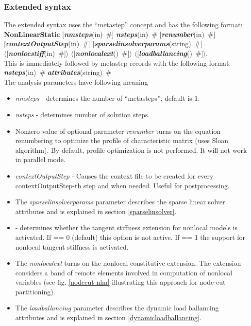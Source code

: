 \documentclass[draft]{article}
\newcommand{\param}[1]{{\em #1}}
\newcommand{\fieldVal}[2]{\mbox{({\it\bf{#1}\#)\tiny (#2)}}}
\newcommand{\keywordnotype}[1]{\mbox{{\it{\bf{#1}}}}}
\newcommand{\keyword}[2]{\mbox{{\keywordnotype{#1}\tiny (#2)}}}
\newcommand{\entKeywordInst}[1]{\mbox{{\bf{{#1}}}}}
\newcommand{\field}[2]{\mbox{\keyword{#1}{#2}~\#}}
\newcommand{\optField}[2]{\mbox{[\field{#1}{#2}]}}
\newcommand{\Pmode}[1]{{\sffamily #1}}
\newcommand{\PoptField}[2]{\mbox{$\langle$[\field{#1}{#2}]$\rangle$}}
\begin{document}
\subsubsection{Extended syntax}
The extended syntax uses the ``metastep'' concept and has the
following format:
\entKeywordInst{NonLinearStatic} \optField{nmsteps}{in} \field{nsteps}{in} \optField{renumber}{in}\\
\optField{contextOutputStep}{in}
\optField{sparselinsolverparams}{string}\\
\PoptField{nonlocstiff}{in} \PoptField{nonlocalext}{} \PoptField{loadballancing}{}.\\
This is immediately followed by metastep records with the following format:
\field{nsteps}{in} \field{attributes}{string}\\
The analysis parameters have following meaning
\begin{itemize}
\item \param{nmsteps} - determines the number of
``metasteps'', default is 1.
\item \param{nsteps} - determines number of solution steps.
\item Nonzero value of optional parameter \param{renumber} turns on the
equation renumbering to optimize the profile of characteristic matrix
(uses Sloan algorithm). By default, profile optimization is not
performed. It will not work in parallel mode.
\item \param{contextOutputStep} - Causes the context file to be
created for every con\-text\-Out\-put\-Step-th step and when needed. Useful for
postprocessing.
\item The  \param{sparselinsolverparams} parameter describes the sparse
linear solver attributes and is explained in section \ref{sparselinsolver}.
\item \Pmode{\param{nonlocstiff} - determines whether the tangent stiffness
extension for nonlocal models is activated. If == 0 (default) this
option is not active. If == 1 the support for nonlocal tangent
stiffness is activated.}
\item \Pmode{The \param{nonlocalext} turns on the nonlocal constitutive
extension. The extension considers a band of remote elements involved
in computation of nonlocal variables (see fig. \ref{nodecut-nlm} illustrating
this approach for node-cut partitioning)}.
\item \Pmode{The  \param{loadballancing} parameter describes the dynamic load ballancing
attributes and is explained in section \ref{dynamicloadballancing}}.


\end{itemize}
\end{document}
